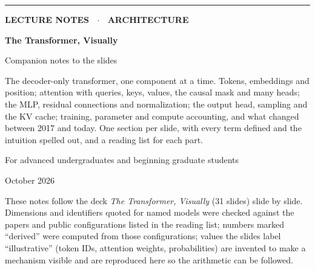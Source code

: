 \documentclass[11pt,letterpaper]{article}
\begin{document}
\begin{titlepage}
\thispagestyle{empty}
\vspace*{2.5cm}
{\color{attn}\rule{3cm}{3pt}}\par\vspace{0.6cm}
{\sffamily\bfseries\color{muted}\large LECTURE NOTES \ $\cdot$ \ ARCHITECTURE\par}
\vspace{0.4cm}
{\sffamily\bfseries\fontsize{34}{38}\selectfont\color{ink} The Transformer, Visually\par}
\vspace{0.3cm}
{\sffamily\fontsize{18}{22}\selectfont\color{ink} Companion notes to the slides\par}
\vspace{1.2cm}
{\large\color{muted}\parbox{0.82\textwidth}{The decoder-only transformer, one component at a time. Tokens, embeddings and position; attention with queries, keys, values, the causal mask and many heads; the MLP, residual connections and normalization; the output head, sampling and the KV cache; training, parameter and compute accounting, and what changed between 2017 and today. One section per slide, with every term defined and the intuition spelled out, and a reading list for each part.}\par}
\vspace{1.5cm}
{\color{muted}For advanced undergraduates and beginning graduate students\par}
\vspace{0.3cm}
{\color{muted}October 2026\par}
\vfill
{\small\color{muted}\parbox{0.9\textwidth}{These notes follow the deck \textit{The Transformer, Visually} (31 slides) slide by slide. Dimensions and identifiers quoted for named models were checked against the papers and public configurations listed in the reading list; numbers marked ``derived'' were computed from those configurations; values the slides label ``illustrative'' (token IDs, attention weights, probabilities) are invented to make a mechanism visible and are reproduced here so the arithmetic can be followed.}\par}
\end{titlepage}

\tableofcontents
\clearpage

\end{document}
